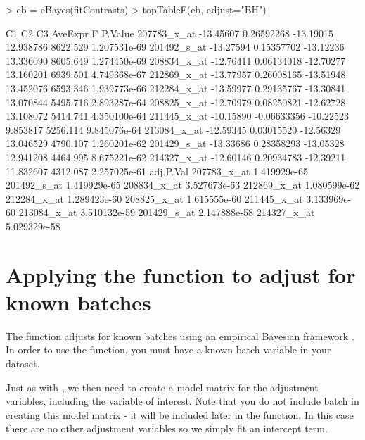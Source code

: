 \documentclass[12pt]{article}
\begin{document}
\begin{Schunk}
\begin{Sinput}
> eb = eBayes(fitContrasts)
> topTableF(eb, adjust="BH")
\end{Sinput}
\begin{Soutput}
                   C1          C2        C3   AveExpr        F      P.Value
207783_x_at -13.45607  0.26592268 -13.19015 12.938786 8622.529 1.207531e-69
201492_s_at -13.27594  0.15357702 -13.12236 13.336090 8605.649 1.274450e-69
208834_x_at -12.76411  0.06134018 -12.70277 13.160201 6939.501 4.749368e-67
212869_x_at -13.77957  0.26008165 -13.51948 13.452076 6593.346 1.939773e-66
212284_x_at -13.59977  0.29135767 -13.30841 13.070844 5495.716 2.893287e-64
208825_x_at -12.70979  0.08250821 -12.62728 13.108072 5414.741 4.350100e-64
211445_x_at -10.15890 -0.06633356 -10.22523  9.853817 5256.114 9.845076e-64
213084_x_at -12.59345  0.03015520 -12.56329 13.046529 4790.107 1.260201e-62
201429_s_at -13.33686  0.28358293 -13.05328 12.941208 4464.995 8.675221e-62
214327_x_at -12.60146  0.20934783 -12.39211 11.832607 4312.087 2.257025e-61
               adj.P.Val
207783_x_at 1.419929e-65
201492_s_at 1.419929e-65
208834_x_at 3.527673e-63
212869_x_at 1.080599e-62
212284_x_at 1.289423e-60
208825_x_at 1.615555e-60
211445_x_at 3.133969e-60
213084_x_at 3.510132e-59
201429_s_at 2.147888e-58
214327_x_at 5.029329e-58
\end{Soutput}
\end{Schunk}


\section{Applying the  function to adjust for known batches} 

The  function adjusts for known batches using an empirical Bayesian framework \cite{johnson:2007aa}.  In order to use the function, you must have a known batch variable in your dataset.

\begin{Schunk}
\end{Schunk}

Just as with , we then need to create a model matrix for the adjustment variables, including the variable of interest. Note that you do not include batch in creating this model matrix - it will be included later in the  function. In this case there are no other adjustment variables so we simply fit an intercept term.
\end{document}
